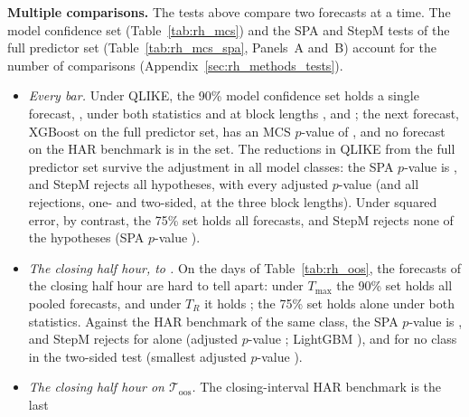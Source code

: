 \item \textbf{Multiple comparisons.} The tests above compare two forecasts at a time. The model confidence set
  (Table~\ref{tab:rh_mcs}) and the SPA and StepM tests of the full predictor set (Table~\ref{tab:rh_mcs_spa},
  Panels~A and~B) account for the number of comparisons (Appendix~\ref{sec:rh_methods_tests}).
  \begin{itemize}
  \item \emph{Every bar.} Under QLIKE, the 90\% model confidence set holds a single forecast,
    \rhmcsBarQlikeTmaxSetNinety, under both statistics and at block lengths \rhmcsBlockLo, \rhmcsBlock{} and
    \rhmcsBlockHi; the next forecast, XGBoost on the full predictor set, has an MCS $p$-value of
    \rhmcsBarQlikeTmaxPXgbFull, and no forecast on the HAR benchmark is in the set. The reductions in QLIKE from the
    full predictor set survive the adjustment in all \rhorAfPairs{} model classes: the SPA $p$-value is
    \rhmcsBarQAfSpaC, and StepM rejects all \rhmcsNAlt{} hypotheses, with every adjusted $p$-value \rhmcsBarQAfPMax{}
    (and all \rhmcsNAlt{} rejections, one- and two-sided, at the three block lengths). Under squared error, by
    contrast, the 75\% set
    holds all \rhmcsBarMseTmaxNSevenFive{} forecasts, and StepM rejects none of the \rhmcsNAlt{} hypotheses (SPA
    $p$-value \rhmcsBarMAfSpaC).
  \item \emph{The closing half hour, \rhorSpanStart{} to \rhorSpanEnd.} On the \rhmcsDaysAll{} days of
    Table~\ref{tab:rh_oos}, the forecasts of the closing half hour are hard to tell apart: under $T_{\max}$ the 90\%
    set holds all \rhmcsAllQlikeTmaxNNinety{} pooled forecasts, and under $T_R$ it holds \rhmcsAllQlikeTrangeSetNinety;
    the 75\% set holds \rhmcsAllQlikeTmaxSetSevenFive{} alone under both statistics. Against the HAR benchmark of the
    same class, the SPA $p$-value is \rhmcsAllQAfSpaC, and StepM rejects for \rhmcsAllQAfRej{} alone (adjusted
    $p$-value \rhmcsAllQAfPXgb; LightGBM \rhmcsAllQAfPLgbm), and for no class in the two-sided test (smallest adjusted
    $p$-value \rhmcsAllQAfPTwoMin).
  \item \emph{The closing half hour on $\mathcal T_{\mathrm{oos}}$.} The closing-interval HAR benchmark is the last

\end{itemize}
